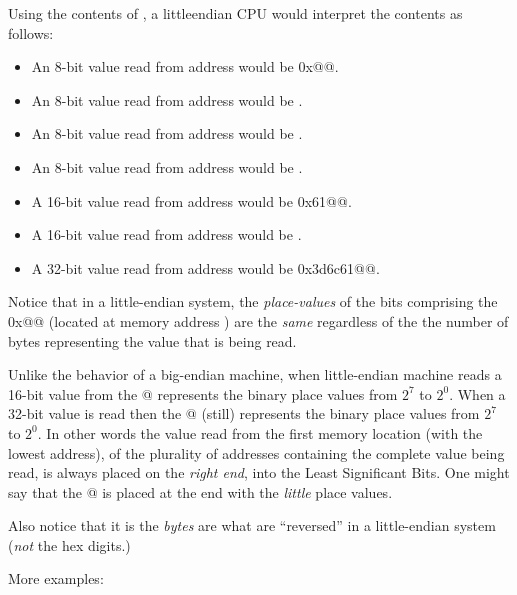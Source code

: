 Using the contents of , a \gls{littleendian}
CPU would interpret the contents as follows:

\begin{itemize}
\item An 8-bit value read from address \colorbox{c_lightblue}{} would be \verb@0x@{\color{red}@}.
\item An 8-bit value read from address  would be .
\item An 8-bit value read from address  would be .
\item An 8-bit value read from address  would be .
\item A 16-bit value read from address \colorbox{c_lightblue}{} would be \verb@0x61@{\color{red}@}.
\item A 16-bit value read from address  would be .
\item A 32-bit value read from address \colorbox{c_lightblue}{} would be \verb@0x3d6c61@{\color{red}@}.
\end{itemize}

Notice that in a little-endian system, the {\em\gls{place-value}s} of the bits 
comprising the \verb@0x@{\color{red}@}
(located at memory address \colorbox{c_lightblue}{})
are the {\em same} regardless of the the number of bytes representing the value that is being read.

Unlike the behavior of a big-endian machine, when little-endian machine 
reads a 16-bit value from \colorbox{c_lightblue}{} the 
{\color{red}@} represents the binary place values from $2^{7}$ to $2^0$.
When a 32-bit value is read then the {\color{red}@} (still) represents
the binary place values from $2^{7}$ to $2^{0}$.  
In other words the value read from the first memory location (with the 
lowest address), of the plurality of addresses containing the complete 
value being read, is always placed on the {\em right end}, into the 
Least Significant Bits.  One might say that the {\color{red}@} 
is placed at the end with the {\em little} place values.

Also notice that it is the {\em bytes} are what are ``reversed'' in a little-endian
system ({\em not} the hex digits.)

More examples:

